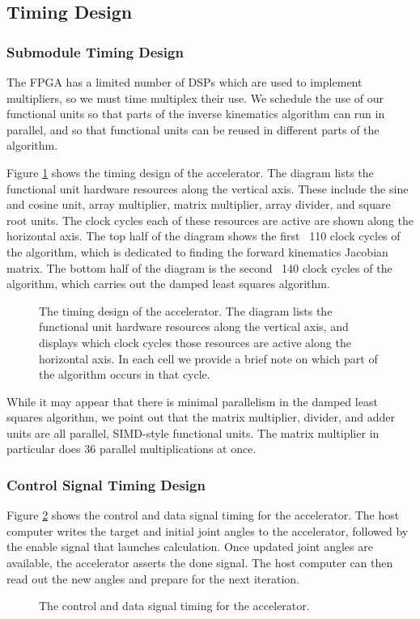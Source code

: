 \subsection{Timing Design}

\subsubsection{Submodule Timing Design}

The FPGA has a limited number of DSPs which are used to implement multipliers, so we must time multiplex their use. We schedule the use of our functional units so that parts of the inverse kinematics algorithm can run in parallel, and so that functional units can be reused in different parts of the algorithm.

Figure \ref{fig:schedule} shows the timing design of the accelerator. The diagram lists the functional unit hardware resources along the vertical axis. These include the sine and cosine unit, array multiplier, matrix multiplier, array divider, and square root units. The clock cycles each of these resources are active are shown along the horizontal axis. The top half of the diagram shows the first ~110 clock cycles of the algorithm, which is dedicated to finding the forward kinematics Jacobian matrix. The bottom half of the diagram is the second ~140 clock cycles of the algorithm, which carries out the damped least squares algorithm.

\begin{figure}[ht]
\center
{}
\caption{The timing design of the accelerator. The diagram lists the functional unit hardware resources along the vertical axis, and displays which clock cycles those resources are active along the horizontal axis. In each cell we provide a brief note on which part of the algorithm occurs in that cycle.}
\label{fig:schedule}
\end{figure}

While it may appear that there is minimal parallelism in the damped least squares algorithm, we point out that the matrix multiplier, divider, and adder units are all parallel, SIMD-style functional units. The matrix multiplier in particular does 36 parallel multiplications at once.

\subsubsection{Control Signal Timing Design}

Figure \ref{fig:timing} shows the control and data signal timing for the accelerator. The host computer writes the target and initial joint angles to the accelerator, followed by the enable signal that launches calculation. Once updated joint angles are available, the accelerator asserts the done signal. The host computer can then read out the new angles and prepare for the next iteration.

\begin{figure}[ht]
\center
{}
\caption{The control and data signal timing for the accelerator.}
\label{fig:timing}
\end{figure}